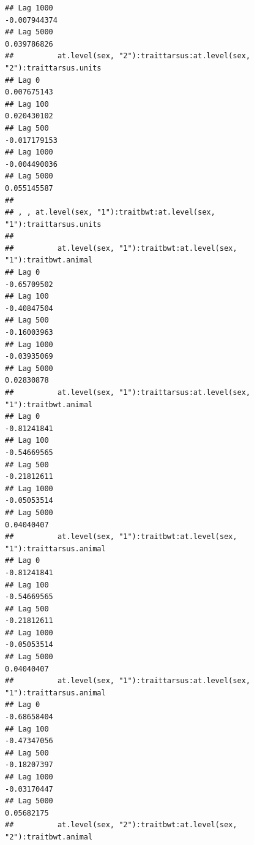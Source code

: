 \documentclass[
  12pt,
]{book}
\begin{document}
\begin{verbatim}
## Lag 1000                                                     -0.007944374
## Lag 5000                                                      0.039786826
##          at.level(sex, "2"):traittarsus:at.level(sex, "2"):traittarsus.units
## Lag 0                                                            0.007675143
## Lag 100                                                          0.020430102
## Lag 500                                                         -0.017179153
## Lag 1000                                                        -0.004490036
## Lag 5000                                                         0.055145587
## 
## , , at.level(sex, "1"):traitbwt:at.level(sex, "1"):traittarsus.units
## 
##          at.level(sex, "1"):traitbwt:at.level(sex, "1"):traitbwt.animal
## Lag 0                                                       -0.65709502
## Lag 100                                                     -0.40847504
## Lag 500                                                     -0.16003963
## Lag 1000                                                    -0.03935069
## Lag 5000                                                     0.02830878
##          at.level(sex, "1"):traittarsus:at.level(sex, "1"):traitbwt.animal
## Lag 0                                                          -0.81241841
## Lag 100                                                        -0.54669565
## Lag 500                                                        -0.21812611
## Lag 1000                                                       -0.05053514
## Lag 5000                                                        0.04040407
##          at.level(sex, "1"):traitbwt:at.level(sex, "1"):traittarsus.animal
## Lag 0                                                          -0.81241841
## Lag 100                                                        -0.54669565
## Lag 500                                                        -0.21812611
## Lag 1000                                                       -0.05053514
## Lag 5000                                                        0.04040407
##          at.level(sex, "1"):traittarsus:at.level(sex, "1"):traittarsus.animal
## Lag 0                                                             -0.68658404
## Lag 100                                                           -0.47347056
## Lag 500                                                           -0.18207397
## Lag 1000                                                          -0.03170447
## Lag 5000                                                           0.05682175
##          at.level(sex, "2"):traitbwt:at.level(sex, "2"):traitbwt.animal

\end{verbatim}
\end{document}

